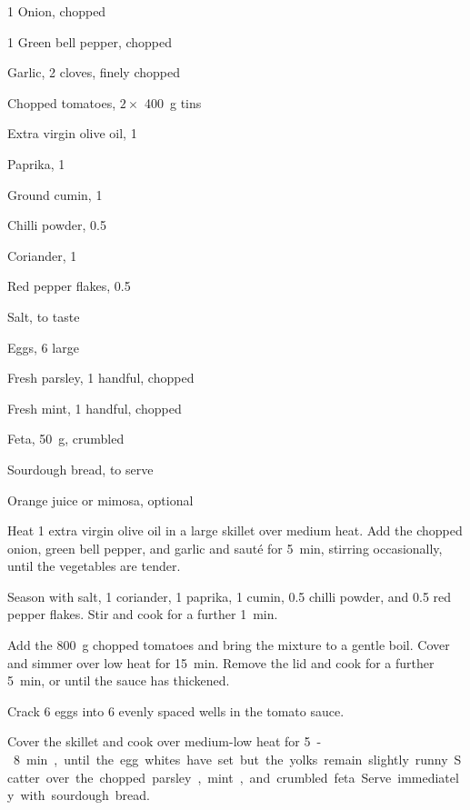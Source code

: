 \label{recipe:murrays_pembroke_shakshuka}

\begin{ingredients}
  \item 1 Onion, chopped
  \item 1 Green bell pepper, chopped
  \item Garlic, 2 cloves, finely chopped
  \item Chopped tomatoes, $2 \times $ \SI{400}{\gram} tins
  \item Extra virgin olive oil, \SI{1}{\tablespoon}
  \item Paprika, \SI{1}{\teaspoon}
  \item Ground cumin, \SI{1}{\teaspoon}
  \item Chilli powder, \qty{0.5}{\teaspoon}
  \item Coriander, \SI{1}{\teaspoon}
  \item Red pepper flakes, \qty{0.5}{\teaspoon}
  \item Salt, to taste
  \item Eggs, 6 large

  \item Fresh parsley, 1 handful, chopped
  \item Fresh mint, 1 handful, chopped
  \item Feta, \SI{50}{\gram}, crumbled
  \item Sourdough bread, to serve
  \item Orange juice or mimosa, optional
\end{ingredients}

\begin{method}
  Heat \SI{1}{\tablespoon} extra virgin olive oil in a large skillet over medium heat. Add the chopped onion, green bell pepper, and garlic and sauté for \SI{5}{\minute}, stirring occasionally, until the vegetables are tender.

  Season with salt, \SI{1}{\teaspoon} coriander, \SI{1}{\teaspoon} paprika, \SI{1}{\teaspoon} cumin, \qty{0.5}{\teaspoon} chilli powder, and \qty{0.5}{\teaspoon} red pepper flakes. Stir and cook for a further \SI{1}{\minute}.

  Add the \SI{800}{\gram} chopped tomatoes and bring the mixture to a gentle boil. Cover and simmer over low heat for \SI{15}{\minute}. Remove the lid and cook for a further \SI{5}{\minute}, or until the sauce has thickened.

  Crack 6 eggs into 6 evenly spaced wells in the tomato sauce.

  Cover the skillet and cook over medium-low heat for \SI{5}-\SI{8}{\minute}, until the egg whites have set but the yolks remain slightly runny.

  Scatter over the chopped parsley, mint, and crumbled feta. Serve immediately with sourdough bread.
\end{method}

